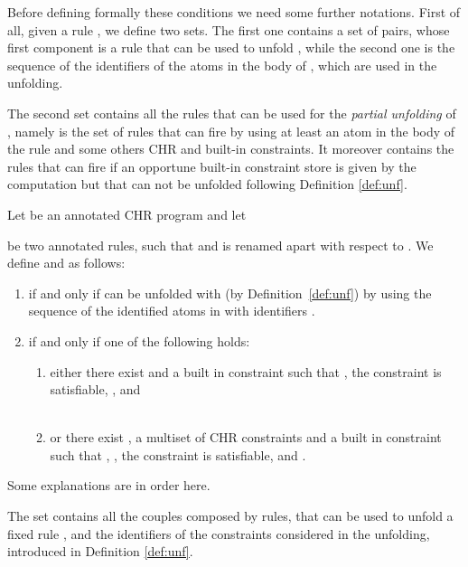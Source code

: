 \documentclass[final]{acmtrans2e}
\begin{document}
Before defining formally these conditions we need some further
notations. First of all, given a rule
, we define
two sets. The first one contains a set of pairs, whose first
component is a rule that can be used to unfold , while the second one is the
sequence of the identifiers of the atoms in the body of , which
are used in the unfolding.

The second set contains all the rules that can be used for the
{\em partial unfolding} of , namely is the set of rules that can fire by
using at least an atom in the body  of the rule and
some others CHR and built-in constraints. It moreover contains
the rules that can fire if an opportune built-in constraint
store is given by the computation but that can not be unfolded
following Definition \ref{def:unf}.



\begin{definition}\label{def:Pposeneg}

Let  be an annotated CHR program and let

be two annotated rules, such that  and   is renamed
apart with respect to . We define  and  as follows:
\begin{enumerate}
    \item\label{uno}  
 if and only if
 can be
unfolded with  (by Definition~\ref{def:unf}) by using the sequence
of the identified atoms in  with identifiers .
    \item\label{due}  if and only if one of the
following holds: \\
\begin{enumerate}
\item\label{ai} either there exist  and
     a built in constraint  such that
    , the constraint
     is satisfiable,
    ,  and\\
  \\
\item\label{bi} or there exist , a multiset of CHR constraints
     and
     a built in constraint  such that ,
    , the constraint
     is satisfiable, 
    and
    .\\
\end{enumerate}
\end{enumerate}
\end{definition}
Some explanations are in order here.

The set  contains all the couples composed by rules, that can be used to unfold a
fixed rule , and the identifiers of the constraints considered in the unfolding,
introduced in Definition \ref{def:unf}.
\end{document}
